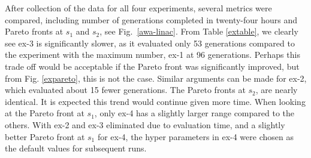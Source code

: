 After collection of the data for all four experiments, several metrics
were compared, including number of generations completed in twenty-four hours and
Pareto fronts at $s_1$ and $s_2$, see Fig.~\ref{awa-linac}.
From Table \ref{extable}, we clearly see ex-3 is significantly 
slower, as it evaluated only 53 generations 
compared to the experiment with the maximum number, ex-1 at 96 generations.
Perhaps this trade off would be acceptable if the Pareto front was significantly 
improved, but from Fig. \ref{expareto}, this is not the case.
Similar arguments can be made for ex-2, which evaluated about 15 fewer generations.
The Pareto fronts at $s_2$, are nearly identical. It is expected
this trend would continue given more time. 
When looking at the Pareto front at $s_1$, only ex-4 has a slightly 
larger range compared to the others.
With ex-2 and ex-3 eliminated due to evaluation time, 
and a slightly better Pareto front at $s_1$ for ex-4, 
the hyper parameters in ex-4 were chosen as the default values for subsequent runs.

